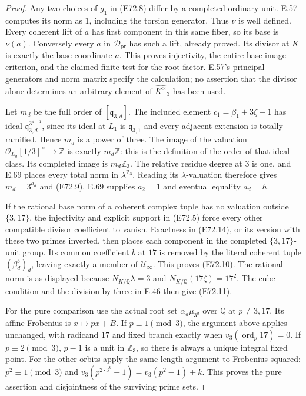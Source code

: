 \begin{proof}
Any two choices of $g_1$ in (E72.8) differ by a completed
ordinary unit. E.57 computes its norm as $1$, including
the torsion generator. Thus $\nu$ is well defined.
Every coherent lift of $a$ has first component in this same
fiber, so its base is $\nu(a)$. Conversely every $a$ in
$\mathcal D_{\mathrm{pr}}$ has such a lift, already proved.
Its divisor at $K$ is exactly the base coordinate $a$.
This proves injectivity, the entire base-image criterion,
and the claimed finite test for the root factor. E.57's
principal generators and norm matrix specify the calculation;
no assertion that the divisor alone determines an arbitrary
element of $\widehat{K^\times}_3$ has been used.

Let $m_d$ be the full order of $[\mathfrak q_{3,d}]$.
The included element $c_1=\beta_1+3\zeta+1$ has ideal
$\mathfrak q_{3,d}^{3^{d-1}}$, since its ideal at $L_1$
is $\mathfrak q_{3,1}$ and every adjacent extension is
totally ramified. Hence $m_d$ is a power of three.
The image of the valuation
$\mathcal O_{L_d}[1/3]^\times\to\mathbb Z$
is exactly $m_d\mathbb Z$: this is the definition of the
order of that ideal class. Its completed image is
$m_d\mathbb Z_3$. The relative residue degree at $3$ is one,
and E.69 places every total norm in
$\lambda^{\mathbb Z_3}$. Reading its $\lambda$-valuation
therefore gives $m_d=3^{a_d}$ and (E72.9).
E.69 supplies $a_2=1$ and eventual equality $a_d=h$.

If the rational base norm of a coherent complex tuple has
no valuation outside $\{3,17\}$, the injectivity and explicit
support in (E72.5) force every other compatible divisor
coefficient to vanish. Exactness in (E72.14), or its version
with these two primes inverted, then places each component
in the completed $\{3,17\}$-unit group. Its common
coefficient $b$ at $17$ is removed by the literal coherent
tuple $(\beta_d^b)_d$, leaving exactly a member of
$\mathcal U_\infty$. This proves (E72.10).
The rational norm is as displayed because
$N_{K/\mathbb Q}\lambda=3$ and
$N_{K/\mathbb Q}(17\zeta)=17^2$.
The cube condition and the division by three in E.46 then
give (E72.11).

For the pure comparison use the actual root set
$\alpha_d\mu_{3^d}$ over $\mathbb Q$ at $p\ne3,17$.
Its affine Frobenius is $x\mapsto px+B$.
If $p\equiv1\pmod3$, the argument above applies unchanged,
with radicand $17$ and fixed branch exactly when
$v_3(\operatorname{ord}_p17)=0$.
If $p\equiv2\pmod3$, $p-1$ is a unit in $\mathbb Z_3$,
so there is always a unique integral fixed point.
For the other orbits apply the same length argument to
Frobenius squared: $p^2\equiv1\pmod3$ and
$v_3(p^{2\cdot3^k}-1)=v_3(p^2-1)+k$.
This proves the pure assertion and disjointness of the
surviving prime sets.


\end{proof}
